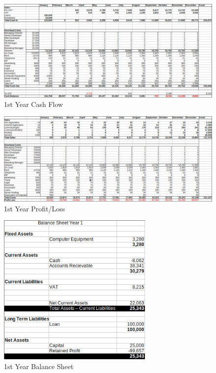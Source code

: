 \documentclass{article}
\begin{document}
\begin{landscape}
\begin{figure}[h]
\centering
        \includegraphics[width=9.0in]{cash_flow_year1.png}
        \caption{1st Year Cash Flow}
        \label{1st Year Cash Flow}
\end{figure}

\begin{figure}[h]
\centering
        \includegraphics[width=9.0in]{profit_loss_year1.png}
        \caption{1st Year Profit/Loss}
        \label{1st Year Profit/Loss}
\end{figure}

\end{landscape}

\begin{figure}[h]
\centering
        \includegraphics[width=3.0in]{balance_sheet_year1.png}
        \caption{1st Year Balance Sheet}
        \label{1st Year Balance Sheet}
\end{figure}
\end{document}
